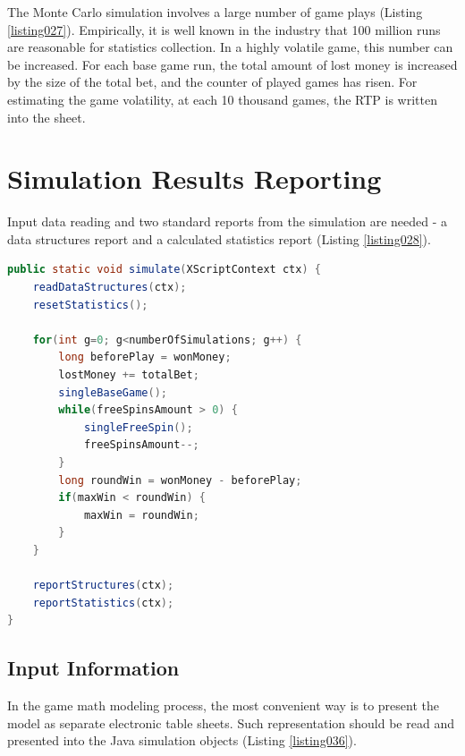 \documentclass[12pt,twoside,openany]{book}
\begin{document}
The Monte Carlo simulation involves a large number of game plays (Listing \ref{listing027}). Empirically, it is well known in the industry that 100 million runs are reasonable for statistics collection. In a highly volatile game, this number can be increased. For each base game run, the total amount of lost money is increased by the size of the total bet, and the counter of played games has risen. For estimating the game volatility, at each 10 thousand games, the RTP is written into the sheet.

\chapter{Simulation Results Reporting}

Input data reading and two standard reports from the simulation are needed - a data structures report and a calculated statistics report (Listing \ref{listing028}).

\begin{lstlisting}[language=Java, caption={Simulation and reports run}, label=listing028]
public static void simulate(XScriptContext ctx) {
	readDataStructures(ctx);
	resetStatistics();

	for(int g=0; g<numberOfSimulations; g++) {
		long beforePlay = wonMoney;
		lostMoney += totalBet;
		singleBaseGame();
		while(freeSpinsAmount > 0) {
			singleFreeSpin();
			freeSpinsAmount--;
		}
		long roundWin = wonMoney - beforePlay;
		if(maxWin < roundWin) {
			maxWin = roundWin;
		}
	}

	reportStructures(ctx);
	reportStatistics(ctx);
}
\end{lstlisting}

\section*{Input Information}

In the game math modeling process, the most convenient way is to present the model as separate electronic table sheets. Such representation should be read and presented into the Java simulation objects (Listing \ref{listing036}).
\end{document}
